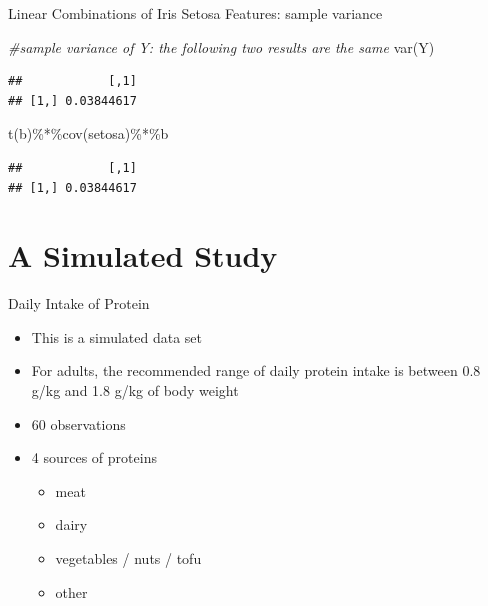 \documentclass[
  ignorenonframetext,
]{beamer}
\newenvironment{Shaded}{\begin{snugshade}}{\end{snugshade}}
\newcommand{\CommentTok}[1]{\textcolor[rgb]{0.56,0.35,0.01}{\textit{#1}}}
\newcommand{\FunctionTok}[1]{\textcolor[rgb]{0.00,0.00,0.00}{#1}}
\newcommand{\NormalTok}[1]{#1}
\newcommand{\SpecialCharTok}[1]{\textcolor[rgb]{0.00,0.00,0.00}{#1}}
\providecommand{\tightlist}{%
  \setlength{\itemsep}{0pt}\setlength{\parskip}{0pt}}
\begin{document}
\begin{frame}[fragile]{Linear Combinations of Iris Setosa Features:
sample variance}
\protect\hypertarget{linear-combinations-of-iris-setosa-features-sample-variance}{}
\begin{Shaded}
\begin{Highlighting}[]
\CommentTok{\#sample variance of Y: the following two results are the same}
\FunctionTok{var}\NormalTok{(Y)}
\end{Highlighting}
\end{Shaded}

\begin{verbatim}
##            [,1]
## [1,] 0.03844617
\end{verbatim}

\begin{Shaded}
\begin{Highlighting}[]
\FunctionTok{t}\NormalTok{(b)}\SpecialCharTok{\%*\%}\FunctionTok{cov}\NormalTok{(setosa)}\SpecialCharTok{\%*\%}\NormalTok{b}
\end{Highlighting}
\end{Shaded}

\begin{verbatim}
##            [,1]
## [1,] 0.03844617
\end{verbatim}
\end{frame}

\hypertarget{a-simulated-study}{%
\section{A Simulated Study}\label{a-simulated-study}}

\begin{frame}{Daily Intake of Protein}
\protect\hypertarget{daily-intake-of-protein}{}
\begin{itemize}
\tightlist
\item
  This is a simulated data set
\item
  For adults, the recommended range of daily protein intake is between
  0.8 g/kg and 1.8 g/kg of body weight
\item
  60 observations
\item
  4 sources of proteins

  \begin{itemize}
  \tightlist
  \item
    meat
  \item
    dairy
  \item
    vegetables / nuts / tofu
  \item
    other
  \end{itemize}
\end{itemize}
\end{frame}
\end{document}
